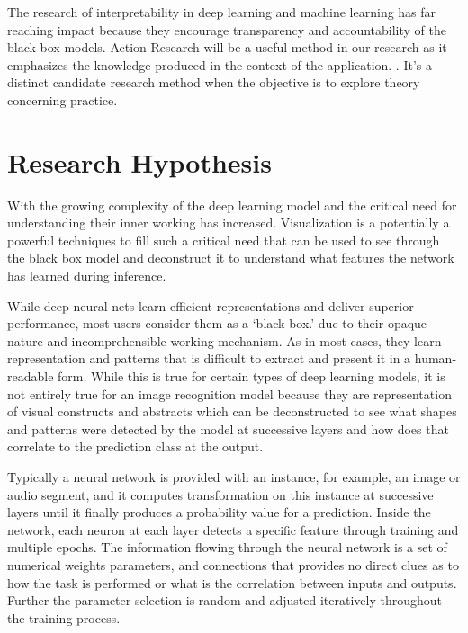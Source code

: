 The research of interpretability in deep learning and machine learning has far reaching impact because they encourage transparency and accountability of the black box models. Action Research will be a useful method in our research as it emphasizes the knowledge produced in the context of the application. \cite{401014119781201}. It’s a distinct candidate research method when the objective is to explore theory concerning practice.

\section{Research Hypothesis}

With the growing complexity of the deep learning model and the critical need for understanding their inner working has increased. Visualization is a potentially a powerful techniques to fill such a critical need that can be used to see through the black box model and deconstruct it to understand what features the network has learned during inference.

While deep neural nets learn efficient representations and deliver superior performance, most users consider them as a ‘black-box.’ due to their opaque nature and incomprehensible working mechanism. As in most cases, they learn representation and patterns that is difficult to extract and present it in a human-readable form. While this is true for certain types of deep learning models, it is not entirely true for an image recognition model because they are representation of visual constructs and abstracts which can be deconstructed to see what shapes and patterns were detected by the model at successive layers \cite{Zeiler} and how does that correlate to the prediction class at the output.

Typically a neural network is provided with an instance, for example, an image or audio segment, and it computes transformation on this instance at successive layers until it finally produces a probability value for a prediction. Inside the network, each neuron at each layer detects a specific feature through training and multiple epochs. The information flowing through the neural network is a set of numerical weights parameters, and connections that provides no direct clues as to how the task is performed or what is the correlation between inputs and outputs. Further the parameter selection is random and adjusted iteratively throughout the training process. %

